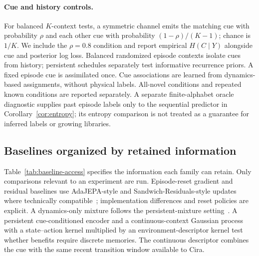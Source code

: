 \paragraph{Cue and history controls.}
For balanced $K$-context tests, a symmetric channel emits the matching cue with probability $\rho$ and each other cue with probability $(1-\rho)/(K-1)$; chance is $1/K$. We include the $\rho=0.8$ condition and report empirical $H(C\mid Y)$ alongside cue and posterior log loss. Balanced randomized episode contexts isolate cues from history; persistent schedules separately test informative recurrence priors. A fixed episode cue is assimilated once. Cue associations are learned from dynamics-based assignments, without physical labels. All-novel conditions and repeated known conditions are reported separately. A separate finite-alphabet oracle diagnostic supplies past episode labels only to the sequential predictor in Corollary~\ref{cor:entropy}; its entropy comparison is not treated as a guarantee for inferred labels or growing libraries.

\subsection{Baselines organized by retained information}

Table~\ref{tab:baseline-access} specifies the information each family can retain. Only comparisons relevant to an experiment are run. Episode-reset gradient and residual baselines use AdaJEPA-style and Sandwich-Residuals-style updates where technically compatible~\cite{wang2026adajepa,soni2026sandwich}; implementation differences and reset policies are explicit. A dynamics-only mixture follows the persistent-mixture setting~\cite{nagabandi2019mole}. A persistent cue-conditioned encoder and a continuous-context Gaussian process with a state--action kernel multiplied by an environment-descriptor kernel test whether benefits require discrete memories. The continuous descriptor combines the cue with the same recent transition window available to Cira.


